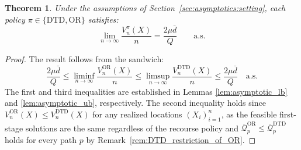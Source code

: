 \documentclass{article}
\newtheorem{theorem}{Theorem}
\begin{document}
{\begin{theorem}\label{thm:asymptotic}
    Under the assumptions of Section~\ref{sec:asymptotics:setting}, each policy $\pi \in \{\text{DTD}, \text{OR}\}$ satisfies:
    \begin{equation}\label{eq:asymptotic_limit}
        \lim_{n \to \infty} \frac{V^{\pi}_n(X)}{n} = \frac{2\mu\bar{d}}{Q} 
        \qquad \text{a.s.}
    \end{equation}
\end{theorem}

\begin{proof} 
The result follows from the sandwich:
\begin{equation}
     \frac{2\mu\bar d}{Q} \leq \liminf_{n \to \infty} \frac{V^{\text{OR}}_n(X)}{n} \leq \limsup_{n \to \infty} \frac{V^{\text{DTD}}_n(X)}{n} \leq \frac{2\mu\bar d}{Q}  \quad \text{a.s.}
\end{equation}
The first and third inequalities are established in Lemmas \ref{lem:asymptotic_lb} and \ref{lem:asymptotic_ub}, respectively. The second inequality holds since $V^{\text{OR}}_n(X) \leq V^{\text{DTD}}_n(X)$ for any realized locations $(X_{i})_{i=1}^n$, as the feasible first-stage solutions are the same regardless of the recourse policy and $\bar{\mathcal{Q}}_p^{\text{OR}} \leq \bar{\mathcal{Q}}_p^{\text{DTD}}$ holds for every path $p$ by Remark~\ref{rem:DTD_restriction_of_OR}.
\end{proof}

}
\end{document}
